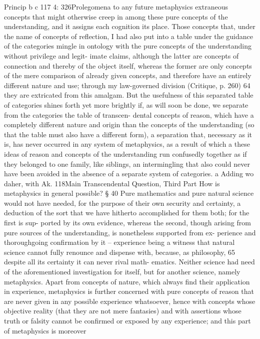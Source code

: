 Princip
b
c
117
4: 326Prolegomena to any future metaphysics
extraneous concepts that might otherwise creep in among these pure
concepts of the understanding, and it assigns each cognition its place.
Those concepts that, under the name of concepts of reﬂection, I had also
put into a table under the guidance of the categories mingle in ontology
with the pure concepts of the understanding without privilege and legit-
imate claims, although the latter are concepts of connection and thereby
of the object itself, whereas the former are only concepts of the mere
comparison of already given concepts, and therefore have an entirely
different nature and use; through my law-governed division (Critique,
p. 260) 64 they are extricated from this amalgam. But the usefulness of
this separated table of categories shines forth yet more brightly if, as
will soon be done, we separate from the categories the table of transcen-
dental concepts of reason, which have a completely different nature and
origin than the concepts of the understanding (so that the table must
also have a different form), a separation that, necessary as it is, has never
occurred in any system of metaphysics, as a result of which a these ideas
of reason and concepts of the understanding run confusedly together as
if they belonged to one family, like siblings, an intermingling that also
could never have been avoided in the absence of a separate system of
categories.
a
Adding wo daher, with Ak.
118Main Transcendental Question,
Third Part
How is metaphysics in general possible?
§ 40
Pure mathematics and pure natural science would not have needed, for
the purpose of their own security and certainty, a deduction of the sort
that we have hitherto accomplished for them both; for the ﬁrst is sup-
ported by its own evidence, whereas the second, though arising from
pure sources of the understanding, is nonetheless supported from ex-
perience and thoroughgoing conﬁrmation by it – experience being a
witness that natural science cannot fully renounce and dispense with,
because, as philosophy, 65 despite all its certainty it can never rival math-
ematics. Neither science had need of the aforementioned investigation
for itself, but for another science, namely metaphysics.
Apart from concepts of nature, which always ﬁnd their application
in experience, metaphysics is further concerned with pure concepts
of reason that are never given in any possible experience whatsoever,
hence with concepts whose objective reality (that they are not mere
fantasies) and with assertions whose truth or falsity cannot be conﬁrmed
or exposed by any experience; and this part of metaphysics is moreover
